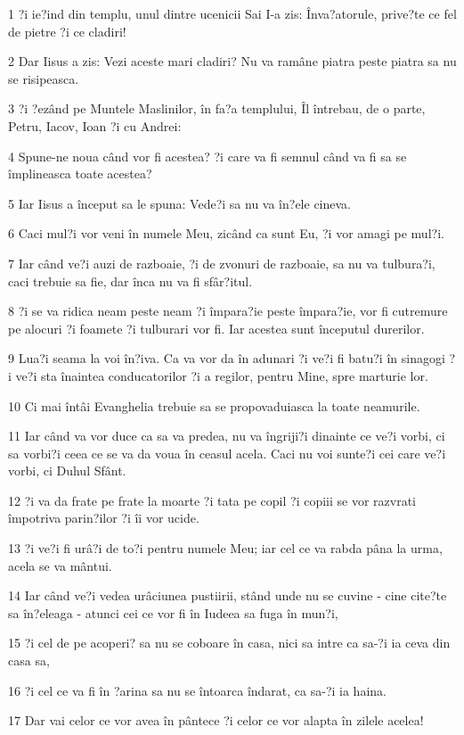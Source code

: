\par 1 ?i ie?ind din templu, unul dintre ucenicii Sai I-a zis: Înva?atorule, prive?te ce fel de pietre ?i ce cladiri!
\par 2 Dar Iisus a zis: Vezi aceste mari cladiri? Nu va ramâne piatra peste piatra sa nu se risipeasca.
\par 3 ?i ?ezând pe Muntele Maslinilor, în fa?a templului, Îl întrebau, de o parte, Petru, Iacov, Ioan ?i cu Andrei:
\par 4 Spune-ne noua când vor fi acestea? ?i care va fi semnul când va fi sa se împlineasca toate acestea?
\par 5 Iar Iisus a început sa le spuna: Vede?i sa nu va în?ele cineva.
\par 6 Caci mul?i vor veni în numele Meu, zicând ca sunt Eu, ?i vor amagi pe mul?i.
\par 7 Iar când ve?i auzi de razboaie, ?i de zvonuri de razboaie, sa nu va tulbura?i, caci trebuie sa fie, dar înca nu va fi sfâr?itul.
\par 8 ?i se va ridica neam peste neam ?i împara?ie peste împara?ie, vor fi cutremure pe alocuri ?i foamete ?i tulburari vor fi. Iar acestea sunt începutul durerilor.
\par 9 Lua?i seama la voi în?iva. Ca va vor da în adunari ?i ve?i fi batu?i în sinagogi ?i ve?i sta înaintea conducatorilor ?i a regilor, pentru Mine, spre marturie lor.
\par 10 Ci mai întâi Evanghelia trebuie sa se propovaduiasca la toate neamurile.
\par 11 Iar când va vor duce ca sa va predea, nu va îngriji?i dinainte ce ve?i vorbi, ci sa vorbi?i ceea ce se va da voua în ceasul acela. Caci nu voi sunte?i cei care ve?i vorbi, ci Duhul Sfânt.
\par 12 ?i va da frate pe frate la moarte ?i tata pe copil ?i copiii se vor razvrati împotriva parin?ilor ?i îi vor ucide.
\par 13 ?i ve?i fi urâ?i de to?i pentru numele Meu; iar cel ce va rabda pâna la urma, acela se va mântui.
\par 14 Iar când ve?i vedea urâciunea pustiirii, stând unde nu se cuvine - cine cite?te sa în?eleaga - atunci cei ce vor fi în Iudeea sa fuga în mun?i,
\par 15 ?i cel de pe acoperi? sa nu se coboare în casa, nici sa intre ca sa-?i ia ceva din casa sa,
\par 16 ?i cel ce va fi în ?arina sa nu se întoarca îndarat, ca sa-?i ia haina.
\par 17 Dar vai celor ce vor avea în pântece ?i celor ce vor alapta în zilele acelea!

